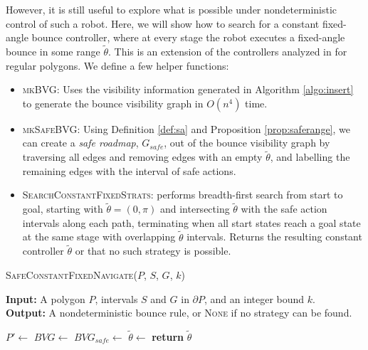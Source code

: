 \documentclass[]{article}
\begin{document}
\vspace{1em}

However, it is still useful to explore what is possible under nondeterministic
control of such a robot. Here, we will show how to
search for a constant fixed-angle bounce controller, where at every stage the
robot executes a fixed-angle bounce in some range $\tilde{\theta}$. This is an
extension of the controllers analyzed in \cite{NilBecLav17} for regular polygons.
We define a few helper functions:

\begin{itemize}
\item \textsc{mkBVG}: Uses the visibility information generated in Algorithm
\ref{algo:insert} to generate the bounce visibility graph in $O(n^4)$ time.
\item \textsc{mkSafeBVG}: Using Definition \ref{def:sa} and Proposition \ref{prop:saferange}, we can create a \emph{safe roadmap}, $G_{safe}$,
        out of the bounce visibility graph by traversing all edges and removing edges with an 
        empty $\tilde{\theta}$, and labelling the remaining edges with the interval 
        of safe actions.
\item \textsc{SearchConstantFixedStrats}: performs breadth-first search from
start to goal, starting with $\tilde{\theta} = (0, \pi)$ and intersecting
$\tilde{\theta}$ with the safe action intervals along each path, terminating
when all start states reach a goal state at the same stage with overlapping
$\tilde{\theta}$ intervals. Returns the resulting constant controller $\tilde{\theta}$ or that
no such strategy is possible.
\end{itemize}

\begin{algorithm}
\caption{\textsc{SafeConstantFixedNavigate}($P$, $S$, $G$, $k$)}
\label{algo:nav}
\hspace*{\algorithmicindent} \textbf{Input:} A polygon $P$, intervals $S$ and
$G$ in $\partial P$, and an integer bound $k$.\\
\hspace*{\algorithmicindent} \textbf{Output:} A nondeterministic bounce rule,
or \textsc{None} if no strategy can be found.
\begin{algorithmic}[1]
\State $P' \gets$ 
\State $BVG \gets$ 
\State $BVG_{safe} \gets$ 
\State $\tilde{\theta} \gets$ 
\State \textbf{return} $\tilde{\theta}$
\end{algorithmic}
\end{algorithm}
\end{document}
